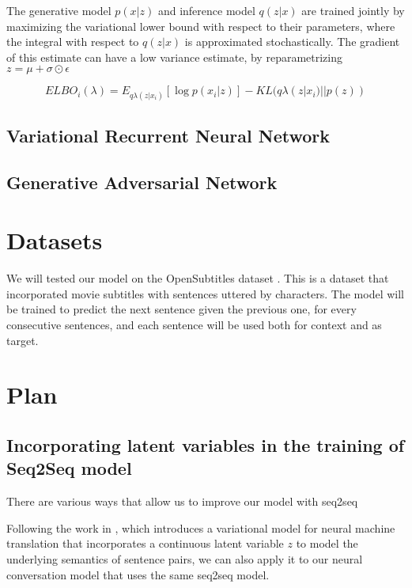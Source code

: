 \documentclass{article}
\begin{document}
The generative model $p(x|z)$ and inference model $q(z|x)$ are trained jointly by maximizing the variational lower bound with respect to their parameters, where the integral with respect to $q(z|x)$ is approximated stochastically. The gradient of this estimate can have a low variance estimate, by reparametrizing $z = \mu+\sigma\odot\epsilon$

$$ELBO_i (\lambda) = E_{q\lambda (z|x_i)}[\log p(x_i|z)]-KL(q\lambda (z|x_i)||p(z))$$ 



\subsection{Variational Recurrent Neural Network}
\cite{vrnn} 

\subsection{Generative Adversarial Network} 
\cite{gan} 
 
\cite{ganncm} 


\section{Datasets}

We will tested our model on the OpenSubtitles
dataset \cite{opensubtitle}. This is a dataset that incorporated movie subtitles with sentences uttered by characters.
The model will be trained to predict the next sentence given the previous one, for every consecutive sentences, and each sentence will be used both for context and as target.

 

\section{Plan}

\subsection{Incorporating latent variables in the training of Seq2Seq model}
There are various ways that allow us to improve our model with seq2seq 

Following the work in \cite{vnmt}, which introduces a variational model for neural machine translation that incorporates a continuous latent variable $z$ to model the underlying semantics of sentence pairs, we can also apply it to our neural conversation model that uses the same seq2seq model. 
\end{document}
